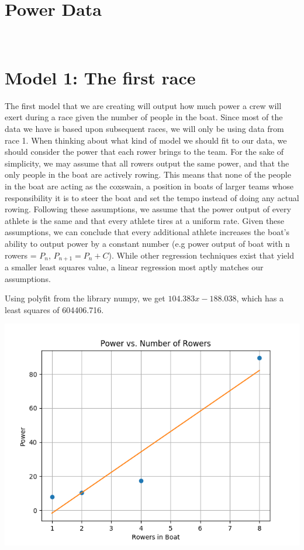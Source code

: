 \documentclass[12pt]{article} %
\begin{document}
\section*{Power Data}
{\centering
{}
\\}

\section*{Model 1: The first race}
The first model that we are creating will output how much power a crew will exert during a race given the number of people in the boat. Since most of the data we have is based upon subsequent races, we will only be using data from race 1. When thinking about what kind of model we should fit to our data, we should consider the power that each rower brings to the team. For the sake of simplicity, we may assume that all rowers output the same power, and that the only people in the boat are actively rowing. This means that none of the people in the boat are acting as the coxswain, a position in boats of larger teams whose responsibility it is to steer the boat and set the tempo instead of doing any actual rowing. Following these assumptions, we assume that the power output of every athlete is the same and that every athlete tires at a uniform rate. Given these assumptions, we can conclude that every additional athlete increases the boat's ability to output power by a constant number (e.g power output of boat with n rowers = $P_{n}$, $P_{n+1}=P_{n}+C$). While other regression techniques exist that yield a smaller least squares value, a linear regression most aptly matches our assumptions.

Using polyfit from the library numpy, we get $104.383x-188.038$, which has a least squares of 604406.716.

\includegraphics{Linear_Line_Done_Correctly.png}
\end{document}

